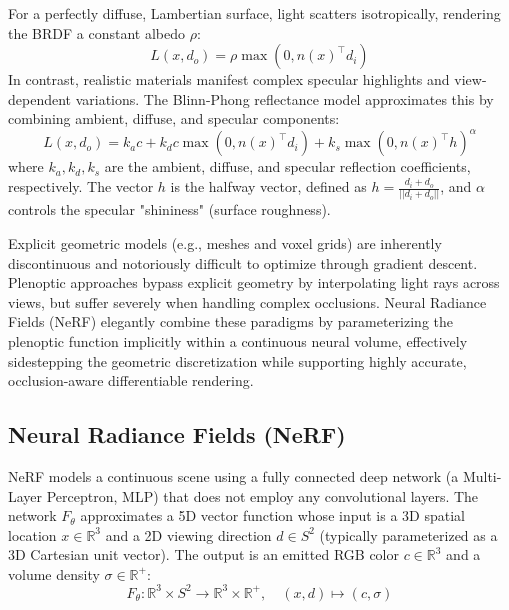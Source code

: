 For a perfectly diffuse, Lambertian surface, light scatters isotropically, rendering the BRDF a constant albedo $\rho$:
\begin{equation}
L(x, d_o) = \rho \max(0, n(x)^\top d_i)
\end{equation}
In contrast, realistic materials manifest complex specular highlights and view-dependent variations. The Blinn-Phong reflectance model approximates this by combining ambient, diffuse, and specular components:
\begin{equation}
L(x, d_o) = k_a c + k_d c \max(0, n(x)^\top d_i) + k_s \max(0, n(x)^\top h)^\alpha
\end{equation}
where $k_a, k_d, k_s$ are the ambient, diffuse, and specular reflection coefficients, respectively. The vector $h$ is the halfway vector, defined as $h = \frac{d_i + d_o}{||d_i + d_o||}$, and $\alpha$ controls the specular "shininess" (surface roughness).

\begin{insightbox}
Explicit geometric models (e.g., meshes and voxel grids) are inherently discontinuous and notoriously difficult to optimize through gradient descent. Plenoptic approaches bypass explicit geometry by interpolating light rays across views, but suffer severely when handling complex occlusions. Neural Radiance Fields (NeRF) elegantly combine these paradigms by parameterizing the plenoptic function implicitly within a continuous neural volume, effectively sidestepping the geometric discretization while supporting highly accurate, occlusion-aware differentiable rendering.
\end{insightbox}

\subsection{Neural Radiance Fields (NeRF)}

NeRF models a continuous scene using a fully connected deep network (a Multi-Layer Perceptron, MLP) that does not employ any convolutional layers. The network $F_\theta$ approximates a 5D vector function whose input is a 3D spatial location $x \in \mathbb{R}^3$ and a 2D viewing direction $d \in S^2$ (typically parameterized as a 3D Cartesian unit vector). The output is an emitted RGB color $c \in \mathbb{R}^3$ and a volume density $\sigma \in \mathbb{R}^+$:
\begin{equation}
F_\theta: \mathbb{R}^3 \times S^2 \to \mathbb{R}^3 \times \mathbb{R}^+, \quad (x, d) \mapsto (c, \sigma)
\end{equation}

